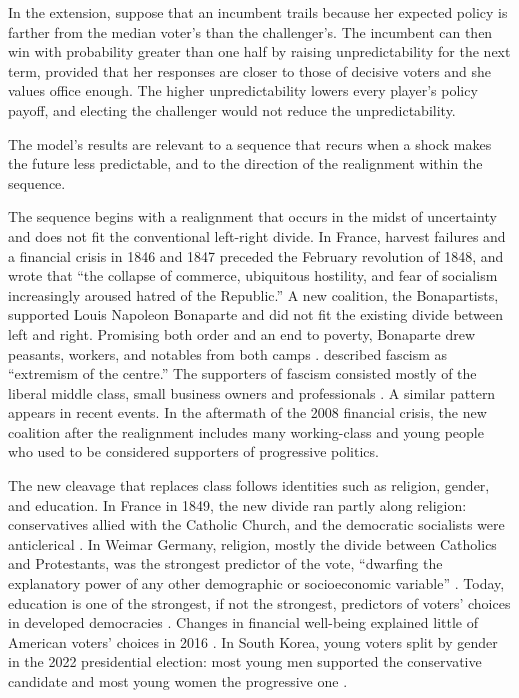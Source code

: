 \documentclass[12pt,letterpaper]{article}
\begin{document}
In the extension, suppose that an incumbent trails because her expected policy is farther from the median voter's than the challenger's. The incumbent can then win with probability greater than one half by raising unpredictability for the next term, provided that her responses are closer to those of decisive voters and she values office enough. The higher unpredictability lowers every player's policy payoff, and electing the challenger would not reduce the unpredictability.

The model's results are relevant to a sequence that recurs when a shock makes the future less predictable, and to the direction of the realignment within the sequence.

The sequence begins with a realignment that occurs in the midst of uncertainty and does not fit the conventional left-right divide. In France, harvest failures and a financial crisis in 1846 and 1847 preceded the February revolution of 1848, and \citet{Tocqueville2016} wrote that ``the collapse of commerce, ubiquitous hostility, and fear of socialism increasingly aroused hatred of the Republic.'' A new coalition, the Bonapartists, supported Louis Napoleon Bonaparte and did not fit the existing divide between left and right. Promising both order and an end to poverty, Bonaparte drew peasants, workers, and notables from both camps \citep{Price2004}. \citet{Lipset1960} described fascism as ``extremism of the centre.'' The supporters of fascism consisted mostly of the liberal middle class, small business owners and professionals \citep{King2008}. A similar pattern appears in recent events. In the aftermath of the 2008 financial crisis, the new coalition after the realignment includes many working-class and young people who used to be considered supporters of progressive politics.

The new cleavage that replaces class follows identities such as religion, gender, and education. In France in 1849, the new divide ran partly along religion: conservatives allied with the Catholic Church, and the democratic socialists were anticlerical \citep{Price2004}. In Weimar Germany, religion, mostly the divide between Catholics and Protestants, was the strongest predictor of the vote, ``dwarfing the explanatory power of any other demographic or socioeconomic variable'' \citep{SpenkuchTillmann2018}. Today, education is one of the strongest, if not the strongest, predictors of voters' choices in developed democracies \citep{Gethin2022,GrossmannHopkins2024,HoogheMarks2018}. Changes in financial well-being explained little of American voters' choices in 2016 \citep{Mutz2018}. In South Korea, young voters split by gender in the 2022 presidential election: most young men supported the conservative candidate and most young women the progressive one \citep{KimHanna2022}.
\end{document}
